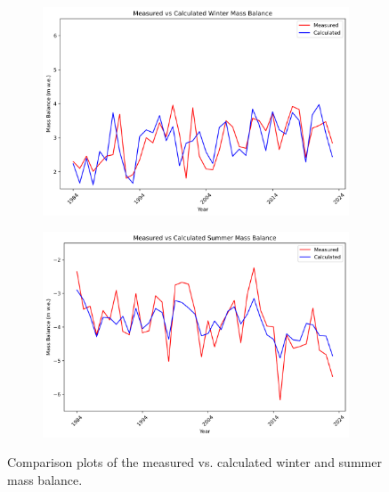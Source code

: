 \documentclass{article}
\begin{document}
\begin{figure}[h!]
    \centering
    \begin{subfigure}[b]{0.49\textwidth}
        \centering
        \includegraphics[width=\textwidth]{Plots/winter_mb_compare.png}
        \label{fig:winter_mb_compare}
    \end{subfigure}
    \hfill
    \begin{subfigure}[b]{0.49\textwidth}
        \centering
        \includegraphics[width=\textwidth]{Plots/summer_mb_compare.png}
        \label{fig:summer_mb_compare}
    \end{subfigure}
    \caption{Comparison plots of the measured vs. calculated winter and summer mass balance.}
    \label{fig:mb_comparison}
\end{figure}
\FloatBarrier
\end{document}
